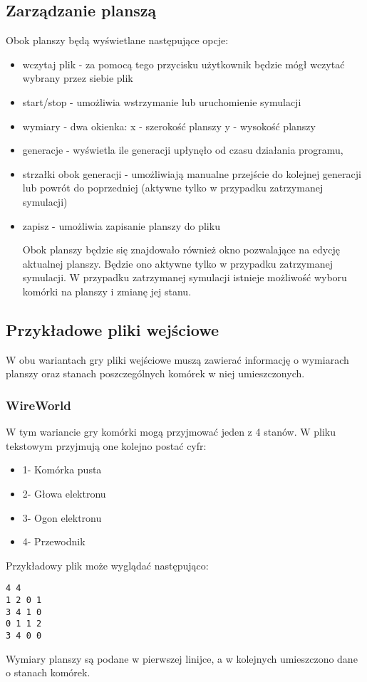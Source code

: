 \documentclass[10pt, oneside]{article}
\begin{document}
\subsection{Zarządzanie planszą}
Obok planszy będą wyświetlane następujące opcje:
\begin{itemize}
\item wczytaj plik -  za pomocą tego przycisku użytkownik będzie mógł wczytać wybrany przez siebie plik
\item start/stop - umożliwia wstrzymanie lub uruchomienie symulacji
\item wymiary - dwa okienka: x - szerokość planszy y - wysokość planszy
\item generacje - wyświetla ile generacji upłynęło od czasu działania programu, \item strzałki obok generacji - umożliwiają manualne przejście do kolejnej generacji lub powrót do poprzedniej (aktywne tylko w przypadku zatrzymanej symulacji)
\item zapisz - umożliwia zapisanie planszy do pliku

Obok planszy będzie się znajdowało również okno pozwalające na edycję aktualnej planszy. Będzie ono aktywne tylko w przypadku zatrzymanej symulacji.
W przypadku zatrzymanej symulacji istnieje możliwość wyboru komórki na planszy i zmianę jej stanu.

\end{itemize}
\subsection{Przykładowe pliki wejściowe}
W obu wariantach gry pliki wejściowe muszą zawierać informację o wymiarach planszy oraz stanach poszczególnych komórek w niej umieszczonych.
\subsubsection{WireWorld}
W tym wariancie gry komórki mogą przyjmować jeden z 4 stanów. W pliku tekstowym przyjmują one kolejno postać cyfr:
\begin{itemize}
\item 1- Komórka pusta
\item 2- Głowa elektronu
\item 3- Ogon elektronu
\item 4- Przewodnik
\end{itemize}
Przykładowy plik może wyglądać następująco:
\begin {verbatim}
4 4
1 2 0 1
3 4 1 0
0 1 1 2
3 4 0 0 
\end{verbatim}
Wymiary planszy są podane w pierwszej linijce, a w kolejnych umieszczono dane o stanach komórek.
\end{document}
